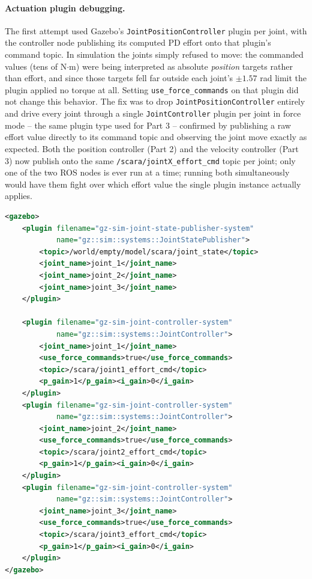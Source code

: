 \documentclass[12pt]{article}
\begin{document}
\paragraph{Actuation plugin debugging.} The first attempt used Gazebo's
\texttt{JointPositionController} plugin per joint, with the controller node publishing its
computed PD effort onto that plugin's command topic. In simulation the joints simply refused to
move: the commanded values (tens of N$\cdot$m) were being interpreted as absolute \emph{position}
targets rather than effort, and since those targets fell far outside each joint's $\pm 1.57$ rad
limit the plugin applied no torque at all. Setting \texttt{use\_force\_commands} on that plugin did
not change this behavior. The fix was to drop \texttt{JointPositionController} entirely and drive
every joint through a single \texttt{JointController} plugin per joint in force mode -- the same
plugin type used for Part 3 -- confirmed by publishing a raw effort value directly to its command
topic and observing the joint move exactly as expected. Both the position controller (Part 2) and
the velocity controller (Part 3) now publish onto the same \texttt{/scara/jointX\_effort\_cmd}
topic per joint; only one of the two ROS nodes is ever run at a time; running both simultaneously
would have them fight over which effort value the single plugin instance actually applies.

\begin{lstlisting}[style=ros, language=XML,
    caption={Single force-mode actuation plugin per joint}]
<gazebo>
    <plugin filename="gz-sim-joint-state-publisher-system"
            name="gz::sim::systems::JointStatePublisher">
        <topic>/world/empty/model/scara/joint_state</topic>
        <joint_name>joint_1</joint_name>
        <joint_name>joint_2</joint_name>
        <joint_name>joint_3</joint_name>
    </plugin>

    <plugin filename="gz-sim-joint-controller-system"
            name="gz::sim::systems::JointController">
        <joint_name>joint_1</joint_name>
        <use_force_commands>true</use_force_commands>
        <topic>/scara/joint1_effort_cmd</topic>
        <p_gain>1</p_gain><i_gain>0</i_gain>
    </plugin>
    <plugin filename="gz-sim-joint-controller-system"
            name="gz::sim::systems::JointController">
        <joint_name>joint_2</joint_name>
        <use_force_commands>true</use_force_commands>
        <topic>/scara/joint2_effort_cmd</topic>
        <p_gain>1</p_gain><i_gain>0</i_gain>
    </plugin>
    <plugin filename="gz-sim-joint-controller-system"
            name="gz::sim::systems::JointController">
        <joint_name>joint_3</joint_name>
        <use_force_commands>true</use_force_commands>
        <topic>/scara/joint3_effort_cmd</topic>
        <p_gain>1</p_gain><i_gain>0</i_gain>
    </plugin>
</gazebo>
\end{lstlisting}
\end{document}
